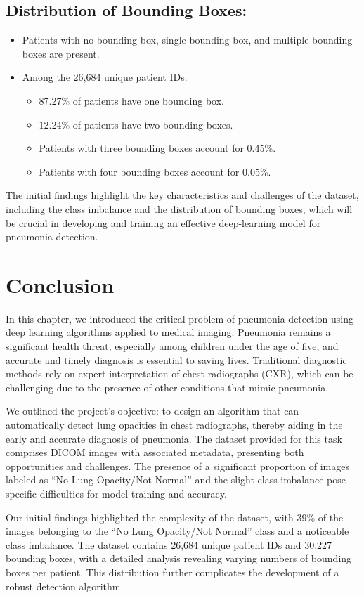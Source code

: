 \subsection{Distribution of Bounding Boxes:}
\label{subsec:chap1 section 3.4}

\begin{itemize}
	\item  Patients with no bounding box, single bounding box, and multiple bounding boxes are present.
	\item Among the 26,684 unique patient IDs:
	      \begin{itemize}
		      \item 87.27\% of patients have one bounding box.
		      \item 12.24\% of patients have two bounding boxes.
		      \item Patients with three bounding boxes account for 0.45\%.
		      \item Patients with four bounding boxes account for 0.05\%.
	      \end{itemize}
\end{itemize}

The initial findings highlight the key characteristics and challenges of the dataset, including the class imbalance and the distribution of bounding boxes, which will be crucial in developing and training an effective deep-learning model for pneumonia detection.

\section{Conclusion}
\label{sec:chap1 section 4}

In this chapter, we introduced the critical problem of pneumonia detection using deep learning algorithms applied to medical imaging. Pneumonia remains a significant health threat, especially among children under the age of five, and accurate and timely diagnosis is essential to saving lives. Traditional diagnostic methods rely on expert interpretation of chest radiographs (CXR), which can be challenging due to the presence of other conditions that mimic pneumonia.

We outlined the project's objective: to design an algorithm that can automatically detect lung opacities in chest radiographs, thereby aiding in the early and accurate diagnosis of pneumonia. The dataset provided for this task comprises DICOM images with associated metadata, presenting both opportunities and challenges. The presence of a significant proportion of images labeled as “No Lung Opacity/Not Normal” and the slight class imbalance pose specific difficulties for model training and accuracy.

Our initial findings highlighted the complexity of the dataset, with 39\% of the images belonging to the “No Lung Opacity/Not Normal” class and a noticeable class imbalance. The dataset contains 26,684 unique patient IDs and 30,227 bounding boxes, with a detailed analysis revealing varying numbers of bounding boxes per patient. This distribution further complicates the development of a robust detection algorithm.